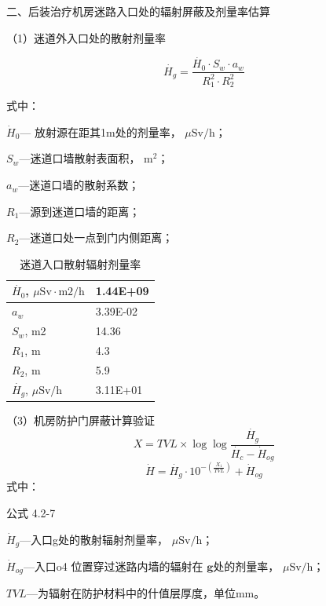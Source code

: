 二、后装治疗机房迷路入口处的辐射屏蔽及剂量率估算

（1）迷道外入口处的散射剂量率

\begin{equation}
    \dot{H_g}=\dfrac{\dot{H_0}\cdot S_w\cdot a_w}{R_1^2\cdot R^2_2}
\end{equation}

式中：

$\dot { H } _ {0}$— 放射源在距其1m处的剂量率， $\mu \mathrm { S v / h }$；

$S _ { w }$—迷道口墙散射表面积， $\mathrm { m } ^ { 2 }$；

$a _ { w }$—迷道口墙的散射系数；

$R_1$—源到迷道口墙的距离；

$R _ { 2 }$—迷道口处一点到门内侧距离；


\begin{table}[H]
\centering
\caption{迷道入口散射辐射剂量率}
\label{tab:ch4-maze}
\begin{tabular}{|m{7cm}|m{7cm}|}
\hline
$\dot{H_0}$, $\mu \mathrm{Sv·m2/h}$ & 1.44E+09 \\
\hline
$a_w$ & 3.39E-02 \\
\hline
$S_w$, m2 & 14.36 \\
\hline
$R_1$, m & 4.3 \\
\hline
$R_2$, m & 5.9 \\
\hline
$\dot{H_g}$, $\mu\mathrm{Sv/h}$ & 3.11E+01 \\
\hline
\end{tabular}
\end{table}

（3）机房防护门屏蔽计算验证
\begin{equation}
    X=TVL\times\log\log\dfrac{\dot{H_g}}{\dot{H_c}-\dot{H}_{og}}
\end{equation}
\begin{equation}
    \dot{H}=\dot{H_g}\cdot10^{-\left(\frac{X_1}{TVL}\right)}+\dot{H}_{og}
\end{equation}
式中：

公式 4.2-7

$\dot { H } _ { g }$—入口g处的散射辐射剂量率， $\mu \mathrm { S v / h }$；

$\dot { H } _ { o g }$—入口o4 位置穿过迷路内墙的辐射在 $\mathbf { g }$处的剂量率， $\mu \mathrm { S v / h }$；

$TVL$—为辐射在防护材料中的什值层厚度，单位mm。


